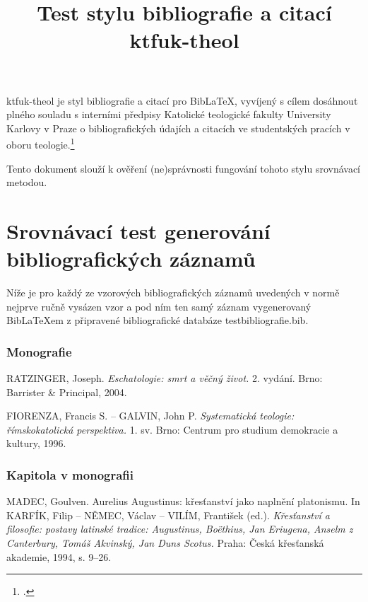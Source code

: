 \documentclass[12pt, a4paper, landscape]{article}
\title{Test stylu bibliografie a citací ktfuk-theol}
\newcommand{\vzduch}{\vspace{8mm}}
\begin{document}
\maketitle

\textsf{ktfuk-theol} je styl bibliografie a citací pro BibLaTeX,
vyvíjený s cílem dosáhnout plného souladu s interními předpisy
Katolické teologické fakulty University Karlovy v Praze 
o bibliografických údajích a citacích ve studentských pracích
v oboru teologie.\footcite[8-12]{ktfukpravidla}

Tento dokument slouží k ověření (ne)správnosti fungování tohoto stylu
srovnávací metodou.

\section{Srovnávací test generování bibliografických záznamů}

Níže je pro každý ze vzorových bibliografických 
záznamů uvedených v normě nejprve  ručně vysázen vzor
a pod ním ten samý záznam vygenerovaný BibLaTeXem z připravené
bibliografické databáze \textsf{testbibliografie.bib}.

\subsubsection{Monografie}

\setlength{\parindent}{0pt}

\indent%
RATZINGER, Joseph. 
\emph{Eschatologie: smrt a věčný život.} 
2. vydání. 
Brno: Barrister \& Principal, 
2004.

\cite{eschatologie}

\vzduch

FIORENZA, Francis S. – GALVIN, John P. 
\emph{Systematická teologie: římskokatolická perspektiva.} 
1. sv. 
Brno: Centrum pro studium demokracie a kultury, 
1996.

\cite{fiorenza}

\subsubsection{Kapitola v monografii}

MADEC, Goulven. 
Aurelius Augustinus: křesťanství jako naplnění platonismu.
In 
KARFÍK, Filip – NĚMEC, Václav – VILÍM, František (ed.). 
\emph{Křesťanství a filosofie: postavy latinské tradice: 
Augustinus, Boëthius, Jan Eriugena, 
Anselm z Canterbury, Tomáš Akvinský, Jan Duns Scotus.} 
Praha: 
Česká křesťanská akademie,
1994, 
s. 9–26.
\end{document}

